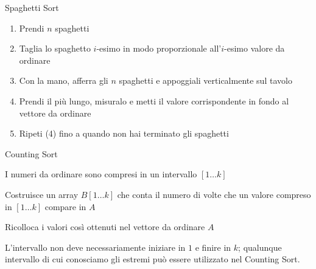 \begin{frame}{Spaghetti Sort}

\vspace{-9pt}
\begin{myboxtitle}
\begin{enumerate}
\item Prendi $n$ spaghetti
\item Taglia lo spaghetto $i$-esimo in modo proporzionale all'$i$-esimo valore da ordinare
\item Con la mano, afferra gli $n$ spaghetti e appoggiali verticalmente sul tavolo
\item Prendi il più lungo, misuralo e metti il valore corrispondente in fondo al vettore da ordinare
\item Ripeti (4) fino a quando non hai terminato gli spaghetti
\end{enumerate}
\end{myboxtitle}
\end{frame}%

\begin{frame}{Counting Sort}

\vspace{-9pt}
\begin{myboxtitle}[Assunzione]
\BI
\item I numeri da ordinare sono compresi in un intervallo $[1 \ldots k]$
\EI
\end{myboxtitle}

\begin{myboxtitle}
\BI
\item  Costruisce un array $B[1 \ldots k]$ che conta il numero di volte che un valore compreso in $[1 \ldots k]$ compare in $A$
\item Ricolloca i valori così ottenuti nel vettore da ordinare  $A$	
\EI
\end{myboxtitle}

\begin{myboxtitle}[Miglioramenti]
\BI
\item L'intervallo non deve necessariamente iniziare in $1$ e finire in $k$; qualunque intervallo di cui conosciamo gli estremi può essere utilizzato
nel Counting Sort.
\EI
\end{myboxtitle}


\end{frame}%


